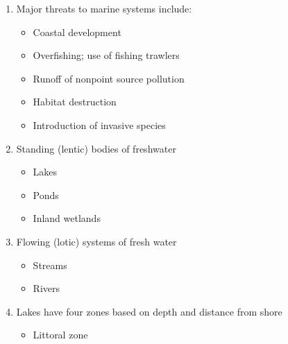 \documentclass[12pt]{article}
\begin{document}
\begin{enumerate}
\begin{itemize}
    \end{itemize}

  \item Major threats to marine systems include:

    \begin{itemize}

      \item Coastal development

      \item Overfishing; use of fishing trawlers

      \item Runoff of nonpoint source pollution

      \item Habitat destruction

      \item Introduction of invasive species

    \end{itemize}

  \item Standing (lentic) bodies of freshwater

    \begin{itemize}

      \item Lakes

      \item Ponds

      \item Inland wetlands

    \end{itemize}

  \item Flowing (lotic) systems of fresh water

    \begin{itemize}

      \item Streams

      \item Rivers

    \end{itemize}

  \item Lakes have four zones based on depth and distance from shore

    \begin{itemize}

      \item Littoral zone

        \begin{itemize}


\end{itemize}
\end{itemize}
\end{enumerate}
\end{document}

